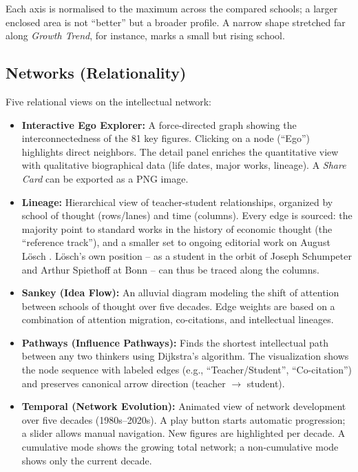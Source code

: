 \documentclass[11pt,a4paper,twoside]{article}
\begin{document}
\begin{lesehilfe}
\rmfamily Each axis is normalised to the maximum across the compared schools; a larger enclosed area is not ``better'' but a broader profile. A narrow shape stretched far along \emph{Growth Trend}, for instance, marks a small but rising school.
\end{lesehilfe}

\subsection{Networks (Relationality)}
Five relational views on the intellectual network:
\begin{itemize}[leftmargin=*,itemsep=2pt,topsep=2pt]
    \item \textbf{Interactive Ego Explorer:} A force-directed graph showing the interconnectedness of the 81 key figures. Clicking on a node (``Ego'') highlights direct neighbors. The detail panel enriches the quantitative view with qualitative biographical data (life dates, major works, lineage). A \textit{Share Card} can be exported as a PNG image.
    \item \textbf{Lineage:} Hierarchical view of teacher-student relationships, organized by school of thought (rows/lanes) and time (columns). Every edge is sourced: the majority point to standard works in the history of economic thought (the ``reference track''), and a smaller set to ongoing editorial work on August Lösch \cite{bieri2026loesch}. Lösch's own position -- as a student in the orbit of Joseph Schumpeter and Arthur Spiethoff at Bonn -- can thus be traced along the columns.
    \item \textbf{Sankey (Idea Flow):} An alluvial diagram modeling the shift of attention between schools of thought over five decades. Edge weights are based on a combination of attention migration, co-citations, and intellectual lineages.
    \item \textbf{Pathways (Influence Pathways):} Finds the shortest intellectual path between any two thinkers using Dijkstra's algorithm. The visualization shows the node sequence with labeled edges (e.g., ``Teacher/Student'', ``Co-citation'') and preserves canonical arrow direction (teacher $\rightarrow$ student).
    \item \textbf{Temporal (Network Evolution):} Animated view of network development over five decades (1980s--2020s). A play button starts automatic progression; a slider allows manual navigation. New figures are highlighted per decade. A cumulative mode shows the growing total network; a non-cumulative mode shows only the current decade.
\end{itemize}
\end{document}
